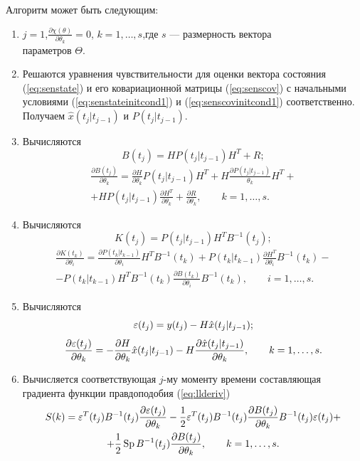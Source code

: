 \documentclass[a4paper,14pt]{extarticle}
\DeclareMathOperator{\Sp}{Sp}
\let\oldref\ref
\renewcommand{\ref}[1]{(\oldref{#1})}
\begin{document}
Алгоритм может быть следующим:

\begin{enumerate} 

\item $j = 1$,\enskip $\frac{\partial \chi (\theta)}{\partial \theta_k} = 0$,
 \enskip $k = 1, \ldots, s$,\quad где $s$ --- размерность вектора \\ параметров
 $\Theta$.

\item Решаются уравнения чувствительности для оценки вектора состояния
\ref{eq:senstate} и его ковариационной матрицы \ref{eq:senscov} с начальными
условиями \ref{eq:senstateinitcond1} и \ref{eq:senscovinitcond1}
соответственно. Получаем $\hat{x}(t_j|t_{j-1})$ и $P(t_j|t_{j-1})$.

\item Вычисляются
\[
	B(t_j) = H P(t_j|t_{j-1}) H^T + R;
\]
\begin{multline}
	\frac{\partial B(t_j)}{\partial \theta_k} =
		\frac{\partial H}{\partial \theta_k} P(t_j|t_{j-1}) H^T + H
		\frac{\partial P(t_j|t_{j-1})}{\theta_k} H^T + \\ +
		H P(t_j|t_{j-1}) \frac{\partial H^T}{\partial \theta_k} +
		\frac{\partial R}{\partial \theta_k},\qquad k = 1, \ldots, s.
\end{multline}

\newcommand{\pd}[2]{\frac{\partial #1}{\partial #2}}

\item Вычисляются
\[
	K(t_j) = P(t_j|t_{j-1}) H^T B^{-1}(t_j);
\]
\begin{multline}
	\pd{K(t_k)}{\theta_i} = \pd{P(t_k|t_{k-1})}{\theta_i} H^T B^{-1}(t_k) +
	P(t_k|t_{k-1}) \pd{H^T}{\theta_i} B^{-1}(t_k) - \\
	- P(t_k|t_{k-1}) H^T B^{-1}(t_k)
	\pd{B(t_k)}{\theta_i} B^{-1}(t_k),\qquad i = 1, \ldots, s.
\end{multline}

\item Вычисляются
\[
	\varepsilon(t_j) = y(t_j) - H \hat{x}(t_j|t_{j-1});
\]
\[
	\pd{\eps(t_j)}{\theta_k} = - \pd{H}{\theta_k} \hat{x}(t_j|t_{j-1}) -
		H \pd{\hat{x}(t_j|t_{j-1})}{\theta_k},\qquad k = 1, \ldots, s.
\]

\item Вычисляется соответствующая $j$-му моменту времени составляющая градиента
функции правдоподобия \ref{eq:llderiv}
\begin{multline}
	S(k) = \eps^T(t_j) B^{-1}(t_j) \pd{\eps(t_j)}{\theta_k} - \frac{1}{2}
	\eps^T(t_j) B^{-1}(t_j) \pd{B(t_j)}{\theta_k} B^{-1}(t_j) \eps(t_j) + \\ +
	\frac{1}{2} \Sp{ B^{-1}(t_j) \pd{B(t_j)}{\theta_k} },\qquad k = 1, \ldots, s.
\end{multline}


\end{enumerate}
\end{document}
